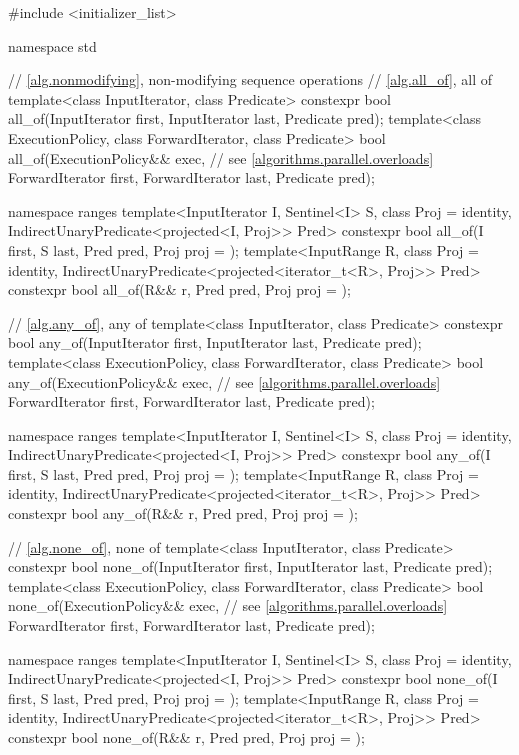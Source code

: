 \begin{codeblock}
#include <initializer_list>

namespace std {
  // \ref{alg.nonmodifying}, non-modifying sequence operations
  // \ref{alg.all_of}, all of
  template<class InputIterator, class Predicate>
    constexpr bool all_of(InputIterator first, InputIterator last, Predicate pred);
  template<class ExecutionPolicy, class ForwardIterator, class Predicate>
    bool all_of(ExecutionPolicy&& exec, // see \ref{algorithms.parallel.overloads}
                ForwardIterator first, ForwardIterator last, Predicate pred);

  namespace ranges {
    template<InputIterator I, Sentinel<I> S, class Proj = identity,
             IndirectUnaryPredicate<projected<I, Proj>> Pred>
      constexpr bool all_of(I first, S last, Pred pred, Proj proj = {});
    template<InputRange R, class Proj = identity,
             IndirectUnaryPredicate<projected<iterator_t<R>, Proj>> Pred>
      constexpr bool all_of(R&& r, Pred pred, Proj proj = {});
  }

  // \ref{alg.any_of}, any of
  template<class InputIterator, class Predicate>
    constexpr bool any_of(InputIterator first, InputIterator last, Predicate pred);
  template<class ExecutionPolicy, class ForwardIterator, class Predicate>
    bool any_of(ExecutionPolicy&& exec, // see \ref{algorithms.parallel.overloads}
                ForwardIterator first, ForwardIterator last, Predicate pred);

  namespace ranges {
    template<InputIterator I, Sentinel<I> S, class Proj = identity,
             IndirectUnaryPredicate<projected<I, Proj>> Pred>
      constexpr bool any_of(I first, S last, Pred pred, Proj proj = {});
    template<InputRange R, class Proj = identity,
             IndirectUnaryPredicate<projected<iterator_t<R>, Proj>> Pred>
      constexpr bool any_of(R&& r, Pred pred, Proj proj = {});
  }

  // \ref{alg.none_of}, none of
  template<class InputIterator, class Predicate>
    constexpr bool none_of(InputIterator first, InputIterator last, Predicate pred);
  template<class ExecutionPolicy, class ForwardIterator, class Predicate>
    bool none_of(ExecutionPolicy&& exec, // see \ref{algorithms.parallel.overloads}
                 ForwardIterator first, ForwardIterator last, Predicate pred);

  namespace ranges {
    template<InputIterator I, Sentinel<I> S, class Proj = identity,
             IndirectUnaryPredicate<projected<I, Proj>> Pred>
      constexpr bool none_of(I first, S last, Pred pred, Proj proj = {});
    template<InputRange R, class Proj = identity,
             IndirectUnaryPredicate<projected<iterator_t<R>, Proj>> Pred>
      constexpr bool none_of(R&& r, Pred pred, Proj proj = {});
  }

}
\end{codeblock}
